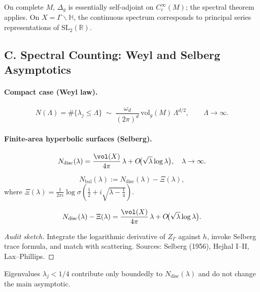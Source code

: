 \begin{remark}
On complete $M$, $\Delta_g$ is essentially self-adjoint on $C_c^\infty(M)$; the spectral theorem applies. On $X=\Gamma\backslash\mathbb H$, the continuous spectrum corresponds to principal series representations of $\mathrm{SL}_2(\mathbb R)$.
\end{remark}


\subsection*{C. Spectral Counting: Weyl and Selberg Asymptotics}
\label{subsec:weyl-sharp}

\paragraph{Compact case (Weyl law).}
\[
  N(\Lambda)=\#\{\lambda_j\le\Lambda\}
  \;\sim\;\frac{\omega_d}{(2\pi)^d}\,\mathrm{vol}_g(M)\,\Lambda^{d/2},\qquad \Lambda\to\infty.
\]

\paragraph{Finite-area hyperbolic surfaces (Selberg).}
\[
  N_{\mathrm{disc}}(\lambda)
  =\frac{\vol(X)}{4\pi}\,\lambda+O\!\big(\sqrt{\lambda}\log\lambda\big),\quad \lambda\to\infty.
\]

\begin{definition}
\[
  N_{\mathrm{bal}}(\lambda):=N_{\mathrm{disc}}(\lambda)-\Xi(\lambda),
\]
where $\Xi(\lambda)=\frac{1}{2\pi i}\log\sigma(\tfrac12+i\sqrt{\lambda-\tfrac14})$.
\end{definition}

\begin{theorem}
\[
  N_{\mathrm{disc}}(\lambda)-\Xi(\lambda)
  =\frac{\vol(X)}{4\pi}\,\lambda+O\!\big(\sqrt{\lambda}\log\lambda\big).
\]
\end{theorem}

\begin{proof}[Audit sketch]
Integrate the logarithmic derivative of $Z_\Gamma$ against $h$, invoke Selberg trace formula, and match with scattering. Sources: Selberg (1956), Hejhal I–II, Lax--Phillips.
\end{proof}

\begin{remark}
Eigenvalues $\lambda_j<1/4$ contribute only boundedly to $N_{\mathrm{disc}}(\lambda)$ and do not change the main asymptotic.
\end{remark}


